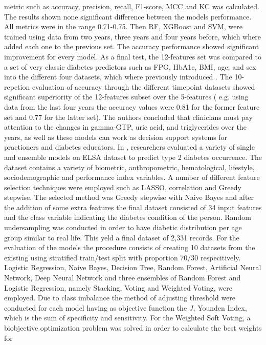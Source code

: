 \documentclass[journal,article,submit,pdftex,moreauthors]{Definitions/mdpi}
\begin{document}
metric such as accuracy, precision, recall, F1-score, MCC and KC was calculated.
The results shown none significant difference between the models performance. All
metrics were in the range 0.71-0.75. Then RF, XGBoost and SVM, were trained
using data from two years, three years and four years before, which where 
added each one to the previous set. The accuracy performance showed significant 
improvement for every model. As a final test, the 12-features set was 
compared to a set of very classic diabetes predictors such as FPG, HbA1c, BMI, age, and
sex into the different four datasets, which where previously introduced .
The 10-repetion evaluation of accuracy through the different timepoint datasets
showed significant superiority of the 12-features subset over the 5-features (
e.g. using data from the last four years the accuracy values were 0.81 for the
former feature set and 0.77 for the latter set). The authors concluded that clinicians
must pay attention to the changes in gamma-GTP, uric acid, and triglycerides over the
years, as well as these models can work as decision support systems for practioners 
and diabetes educators.
In \cite{fazakis}, researchers evaluated a variety of single and ensemble models
on ELSA dataset to predict type 2 diabetes occurrence. The dataset contains a variety
of biometric, anthropometric, hematological, lifestyle, sociodemographic and performance 
index variables. A number of different feature selection techniques were employed
such as LASSO, correlation and Greedy stepwise. The selected method was Greedy
stepwise with Naive Bayes and after the addition of some extra features the final
dataset consisted of 34 input features and the class variable indicating the diabetes
condition of  the person. Random undersampling was conducted in order to have diabetic
distribution per age group similar to real life. This yeld a final dataset of 2,331
records. For the evaluation of the models the procedure consists of creating 
10 datasets from the existing using stratified train/test split with proportion 
70/30 respecitively. Logistic Regression, Naive Bayes, Decision Tree, Random Forest,
Artificial Neural Network, Deep Neural Network and three ensembles of Random Forest
and Logistic Regression, namely Stacking, Voting and Weighted Voting, were employed.
Due to class imbalance the method of adjusting threshold were conducted for each
model having as objective function the $J$, Younden Index, which is the sum of
specificity and sensitivity. For the Weighted Soft Voting, a biobjective
optimization problem was solved in order to calculate  the best weights for 
\end{document}

